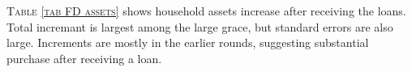 \begin{palepinkleftbar}
\begin{finding}
\textsc{\small Table \ref{tab FD assets}} shows household assets increase after receiving the loans. Total incremant is largest among the large grace, but standard errors are also large. Increments are mostly in the earlier rounds, suggesting substantial purchase after receiving a loan.
\end{finding}
\end{palepinkleftbar}



